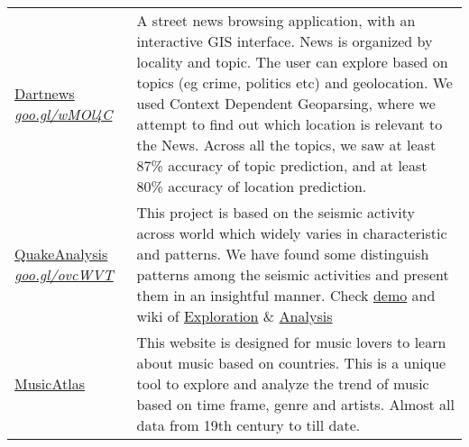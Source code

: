 \documentclass[8pt]{article}
\begin{document}
\begin{tabular}[t]{@{}>{\raggedright\arraybackslash}p{\textwidth-\rcollength-150pt}p{\rcollength+150pt}}
        \href{https://goo.gl/wMOl4C}{Dartnews} \href{https://goo.gl/wMOl4C}{\textit{goo.gl/wMOl4C}}  & \hspace{0.5cm} A street news browsing application, with an interactive GIS interface. News is organized by locality and topic. The user can explore based on topics (eg crime, politics etc) and geolocation. We used Context Dependent Geoparsing, where we attempt to find out which location is relevant to the News. Across all the topics, we saw at least 87\% accuracy of topic prediction, and at least 80\% accuracy of location prediction.\\[0.1cm]
        \href{https://goo.gl/ovcWVT}{QuakeAnalysis} \href{https://goo.gl/ovcWVT}{\textit{goo.gl/ovcWVT}} & \hspace{0.5cm}  This project is based on the seismic activity across world which widely varies in characteristic and patterns. We have found some distinguish patterns among the seismic activities and present them in an insightful manner. Check \href{https://goo.gl/ovcWVT}{demo} and wiki of \href{https://bitbucket.org/debjyotipaul385/quakeanalysis/wiki/Exploration}{Exploration} \& \href{https://bitbucket.org/debjyotipaul385/quakeanalysis/wiki/Analysis}{Analysis}\\
        \href{https://github.com/musicatlas/}{MusicAtlas}
        & \hspace{0.5cm}  This website is designed for music lovers to learn about music based on countries. This is a unique tool to explore and analyze the trend of music based on time frame, genre and artists. Almost all data from 19th century to till date. \\[0.1cm]


\end{tabular}
\end{document}
